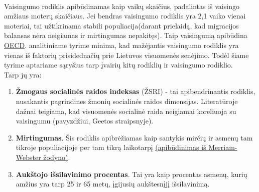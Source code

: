 \paragraph{} Vaisingumo rodiklis apibūdinamas kaip vaikų skaičius, padalintas iš vaisingo amžiaus moterų skaičiaus. Jei bendras vaisingumo rodiklis yra 2,1 vaiko vienai moteriai, tai užtikrinama stabili populiacija(darant prielaidą, kad migracijos balansas nėra neigiamas ir mirtingumas nepakitęs). Taip vaisingumą apibūdina \hyperlink{oecd}{OECD}.
\hypertarget{sen_lt_vis}{\textcite{sensltvis}} analitiniame tyrime minima, kad mažėjantis vaisingumo rodiklis yra vienas iš faktorių prisidednačių prie Lietuvos visuomenės senėjimo.
Todėl šiame tyrime aptariame sąryšius tarp įvairių kitų rodiklių ir vaisingumo rodiklio. \\
Tarp jų yra:
\begin{enumerate}
    \item \textbf{Žmogaus socialinės raidos indeksas} (ŽSRI) - tai apibendrinantis rodiklis, nusakantis pagrindines žmonių socialinės raidos dimensijas. Literatūroje dažnai teigiama, kad visuomenės socialinė raida neigiamai koreliuoja su vaisingumu (pavyzdžiui, Geetos \textcite{nargund2009declining} straipsnyje).
    \item \textbf{Mirtingumas}. Šis rodiklis apibrėžiamas kaip santykis mirčių ir asmenų tam tikroje populiacijoje per tam tikrą laikotarpį \hyperlink{merriam}{(apibūdinimas iš Merriam-Webster žodyno)}. 
    \item \textbf{Aukštojo išsilavinimo procentas}. Tai yra kaip procentas asmenų, kurių amžius yra tarp 25 ir 65 metų, įgijusių aukštesnįjį išsilavinimą.
\end{enumerate}